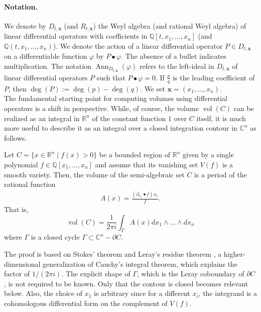 \documentclass[sigconf, nonacm]{acmart} %
\DeclareMathOperator{\vol}{vol}
\begin{document}
\paragraph{Notation.} We denote by $D_{t, \textbf{x}}$ (and $R_{t, \textbf{x}}$) the Weyl algebra (and rational Weyl algebra) of linear differential operators with coefficients in $\mathbb Q[t,x_1,..., x_n]$ (and $\mathbb Q(t,x_1,..., x_n)$). 
We denote the action of a linear differential operator $P \in D_{t,\mathbf{x}}$ on a differentiable function $\varphi$ by $P \bullet \varphi$. The absence of a bullet indicates multiplication.
The notation $\operatorname{Ann}_{D_{t,\mathbf{x}}}(\varphi)$  refers to the left-ideal in $D_{t,\mathbf{x}}$ of linear differential operators $P$ such that $P\bullet \varphi = 0$.  If $\frac{p}{q}$ is the leading coefficient of $P$, then $\deg(P) := \deg(p) - \deg(q)$. We set $\mathbf{x} =(x_1, \dots, x_n)$. 
\\ 

The fundamental starting point for computing volumes using differential operators is a shift in perspective. While, of course, the volume $\vol(C)$ can be realized as an integral in $\mathbb{R}^n$ of the constant function $1$ over $C$ itself, it is much more useful to describe it as an integral over a closed integration contour in $\mathbb{C}^n$ as follows.

\begin{lemma} 
Let $C = \{ x \in \mathbb{R}^n \mid f(x) > 0 \}$ be a bounded region of $\mathbb R^n$ given by a single polynomial $f\in \mathbb{Q}[x_1,\ldots, x_n]$ and assume that its vanishing set $V(f)$ is a smooth variety. 
Then, the volume of the semi-algebraic set $C$ is a period of the rational function 
\begin{align}
    A(x) = \frac{(\partial_{x_1}\bullet f)x_1}{f}.
\end{align}
That is,
    \begin{equation}
        \vol (C) = \frac{1}{2\pi i}\int_{\Gamma} A(x) dx_1\wedge\ldots \wedge dx_n
    \end{equation}
where $\Gamma$ is a closed cycle $\Gamma \subset \mathbb{C}^n-\partial C$.
\end{lemma}

The proof is based on Stokes' theorem and Leray's residue theorem \cite[III, Thm. 2.4]{PhamIntegrals}, a higher-dimensional generalization of Cauchy's integral theorem, which explains the factor of $1/(2\pi i) $. The explicit shape of $\Gamma$, which is the Leray coboundary of $\partial C$, is not required to be known. Only that the contour is closed becomes relevant below. 
Also, the choice of $x_1$ is arbitrary since for a different $x_i$, the integrand is a cohomologous differential form on the complement of $V(f)$. 
 
\end{document}
